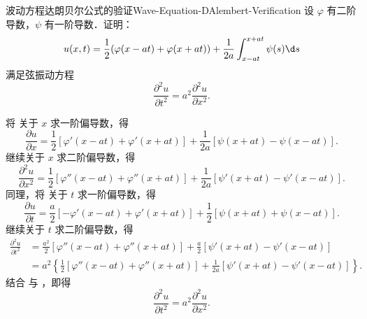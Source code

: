 \begin{problem}{波动方程达朗贝尔公式的验证}{Wave-Equation-DAlembert-Verification}
    设 $\varphi$ 有二阶导数，$\psi$ 有一阶导数．证明：
    \begin{equation}\label{eq:wave-sol}
        u(x,t) = \frac{1}{2}(\varphi(x-at) + \varphi(x+at)) + \frac{1}{2a} \int_{x-at}^{x+at} \psi(s) \d s
    \end{equation}
    满足弦振动方程
    \begin{equation}\label{eq:wave-eq}
        \frac{\partial^2 u}{\partial t^2} = a^2 \frac{\partial^2 u}{\partial x^2}.
    \end{equation}
\end{problem}

\begin{myproof}
    将  关于 $x$ 求一阶偏导数，得
    \begin{equation}\label{eq:wave-ux}
        \frac{\partial u}{\partial x} = \frac{1}{2} \left[ \varphi'(x-at) + \varphi'(x+at) \right] + \frac{1}{2a} \left[ \psi(x+at) - \psi(x-at) \right].
    \end{equation}
    继续关于 $x$ 求二阶偏导数，得
    \begin{equation}\label{eq:wave-uxx}
        \frac{\partial^2 u}{\partial x^2} = \frac{1}{2} \left[ \varphi''(x-at) + \varphi''(x+at) \right] + \frac{1}{2a} \left[ \psi'(x+at) - \psi'(x-at) \right].
    \end{equation}
    同理，将  关于 $t$ 求一阶偏导数，得
    \begin{equation}\label{eq:wave-ut}
        \frac{\partial u}{\partial t} = \frac{a}{2} \left[ -\varphi'(x-at) + \varphi'(x+at) \right] + \frac{1}{2} \left[ \psi(x+at) + \psi(x-at) \right].
    \end{equation}
    继续关于 $t$ 求二阶偏导数，得
    \begin{equation}\label{eq:wave-utt}
        \begin{aligned}
            \frac{\partial^2 u}{\partial t^2} & = \frac{a^2}{2} \left[ \varphi''(x-at) + \varphi''(x+at) \right] + \frac{a}{2} \left[ \psi'(x+at) - \psi'(x-at) \right]                      \\
                                              & = a^2 \left\{ \frac{1}{2} \left[ \varphi''(x-at) + \varphi''(x+at) \right] + \frac{1}{2a} \left[ \psi'(x+at) - \psi'(x-at) \right] \right\}.
        \end{aligned}
    \end{equation}
    结合  与 ，即得
    \begin{equation}\label{eq:wave-result}
        \frac{\partial^2 u}{\partial t^2} = a^2 \frac{\partial^2 u}{\partial x^2}.
    \end{equation}
\end{myproof}


